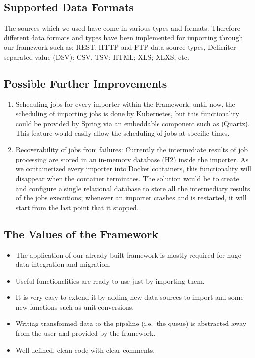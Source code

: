 \subsection{Supported Data Formats}\label{supported-data-formats}

The sources which we used have come in various types and formats.
Therefore different data formats and types have been implemented for
importing through our framework such as: REST, HTTP and FTP
data source types, Delimiter-separated value (DSV): CSV, TSV; HTML;
XLS; XLXS, etc.

\subsection{Possible Further
Improvements}\label{possible-further-improvements}

\begin{enumerate}
\def\labelenumi{\arabic{enumi}.}
\tightlist
\item
  Scheduling jobs for every importer within the Framework: until now,
  the scheduling of importing jobs is done by Kubernetes, but this
  functionality could be provided by Spring via an embeddable component
  such as (Quartz). This feature would easily allow the scheduling of
  jobs at specific times.
\item
  Recoverability of jobs from failures: Currently the intermediate
  results of job processing are stored in an in-memory database (H2)
  inside the importer. As we containerized every importer into Docker
  containers, this functionality will disappear when the container
  terminates. The solution would be to create and configure a single
  relational database to store all the intermediary results of the jobs
  executions; whenever an importer crashes and is restarted, it will
  start from the last point that it stopped.
\end{enumerate}

\subsection{The Values of the
Framework}\label{the-values-of-the-framework}

\begin{itemize}
\tightlist
\item
  The application of our already built framework is mostly required for
  huge data integration and migration.
\item
  Useful functionalities are ready to use just by importing them.
\item
  It is very easy to extend it by adding new data sources to import and
  some new functions such as unit conversions.
\item
  Writing transformed data to the pipeline (i.e.~the queue) is
  abstracted away from the user and provided by the framework.
\item
  Well defined, clean code with clear comments.
\end{itemize}
